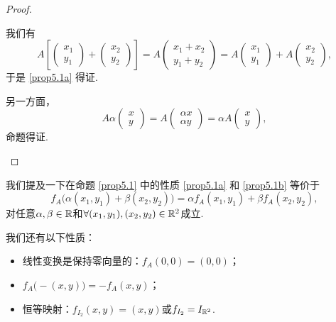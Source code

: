 \begin{proof}
  \begin{inparaenum}[(a)]
    \item 我们有
    \[
      A \left[ \begin{pmatrix}
        x_1 \\
        y_1
      \end{pmatrix} + \begin{pmatrix}
        x_2 \\
        y_2
      \end{pmatrix} \right] = A\begin{pmatrix}
        x_1 + x_2 \\
        y_1 + y_2
      \end{pmatrix} = A\begin{pmatrix}
        x_1 \\
        y_1
      \end{pmatrix}
      + A\begin{pmatrix}
        x_2 \\
        y_2
      \end{pmatrix},
    \]
    于是 \ref{prop5.1a} 得证.

    \item 另一方面，
    \[
      A\alpha \begin{pmatrix}
        x \\
        y
      \end{pmatrix} = A\begin{pmatrix}
        \alpha x \\
        \alpha y
      \end{pmatrix} = \alpha A\begin{pmatrix}
        x \\
        y
      \end{pmatrix},
    \]
    命题得证.
  \end{inparaenum}
\end{proof}

\begin{remark}
  我们提及一下在命题 \ref{prop5.1} 中的性质  \ref{prop5.1a} 和 \ref{prop5.1b} 等价于
  \[
    f_A\big( \alpha(x_1,y_1) + \beta (x_2,y_2) \big) = \alpha f_A(x_1,y_1) + \beta f_A(x_2,y_2),
  \]
  对任意$\alpha,\beta\in\mathbb R$和$\forall(x_1,y_1),(x_2,y_2)\in\mathbb R^2$成立.
\end{remark}

我们还有以下性质：
\begin{itemize}
  \item 线性变换是保持零向量的：$f_A(0,0)=(0,0)$；
  \item $f_A\big(-(x,y)\big)=-f_A(x,y)$；
  \item 恒等映射：$f_{I_2}(x,y)=(x,y)$或$f_{I_2}=I_{\mathbb R^2}$.
\end{itemize}

